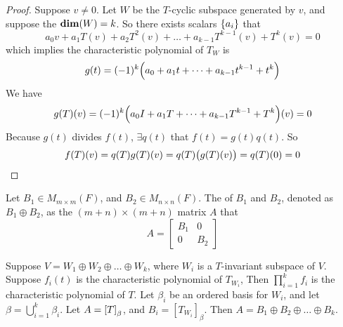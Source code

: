 \begin{proof}
    Suppose $v \neq 0$. Let $W$ be the $T$-cyclic subspace generated by $v$, and suppose the $\dimension{W} =k$. So there exists scalars $\set{a_i}$ that 
    \begin{equation*}
        a_0 v + a_1 T(v) + a_2 T^2(v) + \dots + a_{k-1} T^{k-1}(v) + T^k(v) = 0
    \end{equation*}
    which implies the characteristic polynomial of $T_W$ is
    \begin{equation*}
        g(t) = (-1)^k \mleft(a_0 + a_1 t + \dots + a_{k-1} t^{k-1} + t^k \mright)
    \end{equation*}
    We have
    \begin{equation*}
        g(T)(v) = (-1)^k \mleft(a_0 I + a_1 T + \dots + a_{k-1} T^{k-1} + T^k \mright)(v) = 0
    \end{equation*}
    Because $g(t)$ divides $f(t)$, $\exists q(t)$ that $f(t) = g(t) q(t)$. So
    \begin{equation*}
        f(T)(v) = q(T)g(T)(v) = q(T) \mleft(g(T)(v)\mright) = q(T)(0) = 0
    \end{equation*}
\end{proof}



\begin{definition}
    Let $B_1 \in M_{m \times m}(F)$, and $B_2 \in M_{n \times n} (F)$. The  of $B_1$ and $B_2$, denoted as $B_1 \oplus B_2$, as the $(m+n) \times (m+n)$ matrix $A$ that
    \begin{equation*}
        A = \begin{bmatrix}
            B_1 & 0 \\
            0 & B_2
        \end{bmatrix}
    \end{equation*}
\end{definition}


\begin{theorem}
    Suppose $V=W_1 \oplus W_2 \oplus \dots \oplus W_k$, where $W_i$ is a $T$-invariant subspace of $V$. Suppose $f_i(t)$ is the characteristic polynomial of $T_{W_i}$, Then $\displaystyle \prod_{i=1}^k f_i$ is the characteristic polynomial of $T$. Let $\beta_i$ be an ordered basis for $W_i$, and let $\displaystyle \beta = \bigcup_{i=1}^k \beta_i$. Let $A=\coordinate{T}_\beta$, and $B_i=[T_{W_i}]_\beta$. Then $A = B_1 \oplus B_2 \oplus \dots \oplus B_k$.
\end{theorem}



